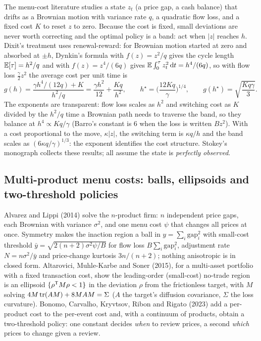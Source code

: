 The menu-cost literature studies a state $z_t$ (a price gap, a cash balance) that drifts as a Brownian motion with variance rate $q$, a quadratic flow loss, and a fixed cost $K$ to reset $z$ to zero. Because the cost is fixed, small deviations are never worth correcting and the optimal policy is a band: act when $|z|$ reaches $h$. Dixit's treatment uses renewal-reward: for Brownian motion started at zero and absorbed at $\pm h$, Dynkin's formula with $f(z) = z^2/q$ gives the cycle length $\mathbb{E}[\tau] = h^2/q$ and with $f(z) = z^4/(6q)$ gives $\mathbb{E}\int_0^\tau z_t^2\,\mathrm{d} t = h^4/(6q)$, so with flow loss $\tfrac{\gamma}{2}z^2$ the average cost per unit time is
\begin{equation}
g(h) = \frac{\gamma h^4/(12q) + K}{h^2/q} = \frac{\gamma h^2}{12} + \frac{Kq}{h^2},
\qquad h^\star = \Big(\frac{12Kq}{\gamma}\Big)^{1/4},\qquad g(h^\star) = \sqrt{\frac{Kq\gamma}{3}}.
\label{eq:deadband:dixit}
\end{equation}
The exponents are transparent: flow loss scales as $h^2$ and switching cost as $K$ divided by the $h^2/q$ time a Brownian path needs to traverse the band, so they balance at $h^4 \propto Kq/\gamma$ (Barro's constant is 6 when the loss is written $Bz^2$). With a cost proportional to the move, $\kappa|z|$, the switching term is $\kappa q/h$ and the band scales as $(6\kappa q/\gamma)^{1/3}$: the exponent identifies the cost structure. Stokey's monograph collects these results; all assume the state is \emph{perfectly observed}.

\subsection{Multi-product menu costs: balls, ellipsoids and two-threshold policies}

Alvarez and Lippi (2014) solve the $n$-product firm: $n$ independent price gaps, each Brownian with variance $\sigma^2$, and one menu cost $\psi$ that changes all prices at once. Symmetry makes the inaction region a ball in $y = \sum_i\mathrm{gap}_i^2$ with small-cost threshold $\bar y = \sqrt{2(n+2)\sigma^2\psi/B}$ for flow loss $B\sum_i\mathrm{gap}_i^2$, adjustment rate $N = n\sigma^2/\bar y$ and price-change kurtosis $3n/(n+2)$; nothing anisotropic is in closed form. Altarovici, Muhle-Karbe and Soner (2015), for a multi-asset portfolio with a fixed transaction cost, show the leading-order (small-cost) no-trade region is an ellipsoid $\{\rho^{\mathsf{T}} M\rho < 1\}$ in the deviation $\rho$ from the frictionless target, with $M$ solving $4M\operatorname{tr}(AM) + 8MAM = \Sigma$ ($A$ the target's diffusion covariance, $\Sigma$ the loss curvature). Bonomo, Carvalho, Kryvtsov, Ribon and Rigato (2023) add a per-product cost to the per-event cost and, with a continuum of products, obtain a two-threshold policy: one constant decides \emph{when} to review prices, a second \emph{which} prices to change given a review.

